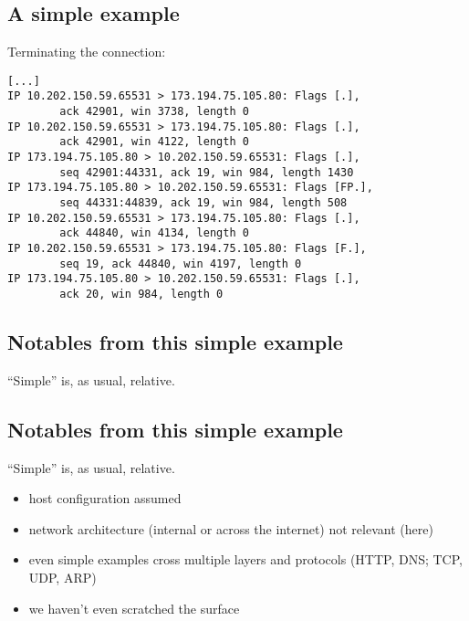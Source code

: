 \documentclass[xga]{xdvislides}
\begin{document}
\subsection{A simple example}
Terminating the connection:
\begin{verbatim}
[...]
IP 10.202.150.59.65531 > 173.194.75.105.80: Flags [.],
        ack 42901, win 3738, length 0
IP 10.202.150.59.65531 > 173.194.75.105.80: Flags [.],
        ack 42901, win 4122, length 0
IP 173.194.75.105.80 > 10.202.150.59.65531: Flags [.],
        seq 42901:44331, ack 19, win 984, length 1430
IP 173.194.75.105.80 > 10.202.150.59.65531: Flags [FP.],
        seq 44331:44839, ack 19, win 984, length 508
IP 10.202.150.59.65531 > 173.194.75.105.80: Flags [.],
        ack 44840, win 4134, length 0
IP 10.202.150.59.65531 > 173.194.75.105.80: Flags [F.],
        seq 19, ack 44840, win 4197, length 0
IP 173.194.75.105.80 > 10.202.150.59.65531: Flags [.],
        ack 20, win 984, length 0
\end{verbatim}

\subsection{Notables from this simple example}
``Simple'' is, as usual, relative.

\subsection{Notables from this simple example}
``Simple'' is, as usual, relative.
\\

\begin{itemize}
	\item host configuration assumed
	\item network architecture (internal or across the internet) not
			relevant (here)
	\item even simple examples cross multiple layers and protocols
			(HTTP, DNS; TCP, UDP, ARP)
	\item we haven't even scratched the surface
\end{itemize}
\end{document}
